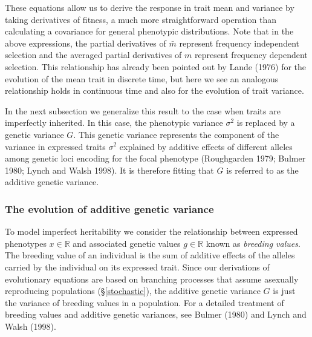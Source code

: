 \documentclass[]{article}
\begin{document}
These equations allow us to derive the response in trait mean and
variance by taking derivatives of fitness, a much more straightforward
operation than calculating a covariance for general phenotypic
distributions. Note that in the above expressions, the partial
derivatives of \(\bar m\) represent frequency independent selection and
the averaged partial derivatives of \(m\) represent frequency dependent
selection. This relationship has already been pointed out by Lande
(1976) for the evolution of the mean trait in discrete time, but here we
see an analogous relationship holds in continuous time and also for the
evolution of trait variance.

In the next subsection we generalize this result to the case when traits
are imperfectly inherited. In this case, the phenotypic variance
\(\sigma^2\) is replaced by a genetic variance \(G\). This genetic
variance represents the component of the variance in expressed traits
\(\sigma^2\) explained by additive effects of different alleles among
genetic loci encoding for the focal phenotype (Roughgarden 1979; Bulmer
1980; Lynch and Walsh 1998). It is therefore fitting that \(G\) is
referred to as the additive genetic variance.

\hypertarget{the-evolution-of-additive-genetic-variance}{%
\subsubsection{\texorpdfstring{The evolution of additive genetic
variance
\label{inheritance}}{The evolution of additive genetic variance }}\label{the-evolution-of-additive-genetic-variance}}

To model imperfect heritability we consider the relationship between
expressed phenotypes \(x\in\mathbb{R}\) and associated genetic values
\(g\in\mathbb{R}\) known as \emph{breeding values}. The breeding value
of an individual is the sum of additive effects of the alleles carried
by the individual on its expressed trait. Since our derivations of
evolutionary equations are based on branching processes that assume
asexually reproducing populations (\S\ref{stochastic}), the additive
genetic variance \(G\) is just the variance of breeding values in a
population. For a detailed treatment of breeding values and additive
genetic variances, see Bulmer (1980) and Lynch and Walsh (1998).
\end{document}
